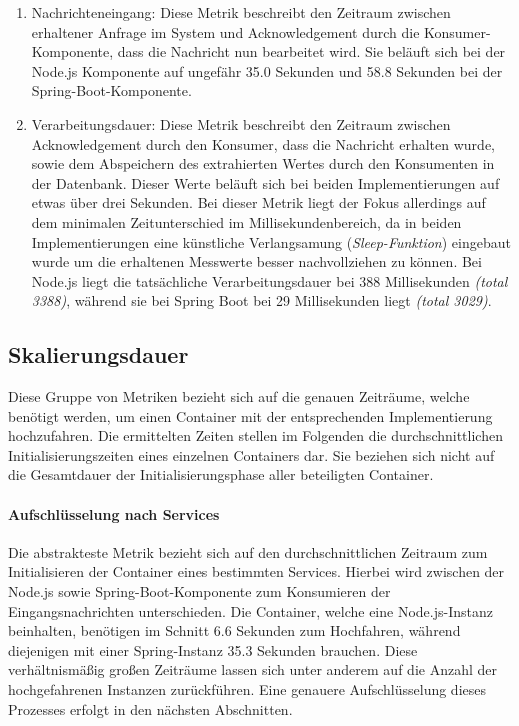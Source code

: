 \begin{enumerate}
  \item Nachrichteneingang: Diese Metrik beschreibt den Zeitraum zwischen erhaltener Anfrage im System und Acknowledgement durch die Konsumer-Komponente, dass die Nachricht nun bearbeitet wird. Sie beläuft sich bei der Node.js Komponente auf ungefähr 35.0 Sekunden und 58.8 Sekunden bei der Spring-Boot-Komponente. 
  \item Verarbeitungsdauer: Diese Metrik beschreibt den Zeitraum zwischen Acknowledgement durch den Konsumer, dass die Nachricht erhalten wurde, sowie dem Abspeichern des extrahierten Wertes durch den Konsumenten in der Datenbank. Dieser Werte beläuft sich bei beiden Implementierungen auf etwas über drei Sekunden. Bei dieser Metrik liegt der Fokus allerdings auf dem minimalen Zeitunterschied im Millisekundenbereich, da in beiden Implementierungen eine künstliche Verlangsamung (\emph{Sleep-Funktion}) eingebaut wurde um die erhaltenen Messwerte besser nachvollziehen zu können. Bei Node.js liegt die tatsächliche Verarbeitungsdauer bei 388 Millisekunden \emph{(total 3388)}, während sie bei Spring Boot bei 29 Millisekunden liegt \emph{(total 3029)}.
\end{enumerate}


\subsection{Skalierungsdauer \checkmark}
Diese Gruppe von Metriken bezieht sich auf die genauen Zeiträume, welche benötigt werden, um einen Container mit der entsprechenden Implementierung hochzufahren. Die ermittelten Zeiten stellen im Folgenden die durchschnittlichen Initialisierungszeiten eines einzelnen Containers dar. Sie beziehen sich nicht auf die Gesamtdauer der Initialisierungsphase aller beteiligten Container.


\paragraph{Aufschlüsselung nach Services \checkmark}
Die abstrakteste Metrik bezieht sich auf den durchschnittlichen Zeitraum zum Initialisieren der Container eines bestimmten Services. Hierbei wird zwischen der Node.js sowie Spring-Boot-Komponente zum Konsumieren der Eingangsnachrichten unterschieden. Die Container, welche eine Node.js-Instanz beinhalten, benötigen im Schnitt 6.6 Sekunden zum Hochfahren, während diejenigen mit einer Spring-Instanz 35.3 Sekunden brauchen. Diese verhältnismäßig großen Zeiträume lassen sich unter anderem auf die Anzahl der hochgefahrenen Instanzen zurückführen. Eine genauere Aufschlüsselung dieses Prozesses erfolgt in den nächsten Abschnitten. 


